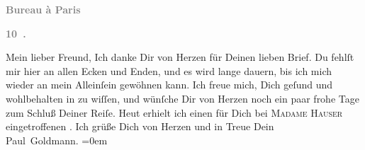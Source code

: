 \begin{ledgroupsized}[t]{13cm}
           \pstart
           \begin{otherlanguage}{french}\textcolor{gray}{\textbf{\textbf{Bureau à Paris}}}\end{otherlanguage}\pend
           \pstart
           \begin{otherlanguage}{french}\textcolor{gray}{\textbf{\textbf{10 .}}}\end{otherlanguage}\pend
           \pstart\center{}Mein lieber Freund,\pend\pstart
           Ich danke Dir von Herzen für Deinen lieben Brief. Du fehlſt mir hier an allen Ecken
               und Enden, und es wird lange dauern, bis ich mich wieder an mein Alleinſein gewöhnen
               kann. Ich freue mich, Dich geſund und wohlbehalten in \label{K_L02813-1v}\label{K_L02813-1h} zu wiſſen, und wünſche Dir von Herzen
               noch ein paar frohe Tage zum Schluß Deiner Reiſe. Heut
               erhielt ich einen für Dich bei \textsc{Madame Hauser} eingetroffenen \label{K_L02813-2v}\label{K_L02813-2h}. Ich grüße Dich von Herzen und in Treue\pend
           \pstart
           Dein {\\[\baselineskip]}\spacefill\mbox{Paul Goldmann.}\pend
           \leftskip=0em{}
         
         \endnumbering{}\end{ledgroupsized}  \newcommand{\dateiname}{L02813}\newcommand{\titel}{Paul Goldmann an Arthur Schnitzler, 26. 5. [1897]}\newcommand{\editorInnen}{Martin Anton Müller und Laura Untner}
      